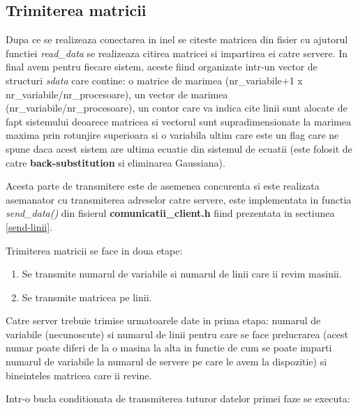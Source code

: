 \subsection{Trimiterea matricii}

\hspace{5mm}Dupa ce se realizeaza conectarea in inel se citeste matricea din
fisier cu ajutorul functiei {\it read\_data} se realizeaza citirea matricei si 
impartirea ei catre servere. In final avem pentru fiecare sistem, aceste
fiind organizate intr-un vector de structuri {\it sdata} care contine: o 
matrice de marimea (nr\_variabile+1 x nr\_variabile/nr\_procesoare), un
vector de marimea (nr\_variabile/nr\_procesoare), un contor care va indica
cite linii sunt alocate de fapt sistemului deoarece matricea si vectorul sunt
supradimensionate la marimea maxima prin rotunjire superioara si o variabila
ultim care este un flag care ne spune daca acest sistem are ultima ecuatie
din sistemul de ecuatii (este folosit de catre {\bf back-substitution} si
eliminarea Gaussiana).

Acesta parte de transmitere este de asemenea concurenta si este realizata
asemanator cu transmiterea adreselor catre servere, este implementata in
functia {\it send\_data()} din fisierul {\bf comunicatii\_client.h} fiind
prezentata in sectiunea \ref{send-linii}.

Trimiterea matricii se face in doua etape:
\begin{enumerate}
\item Se transmite numarul de variabile si numarul de linii care ii revim
masinii.
\item Se transmite matricea pe linii.
\end{enumerate}

Catre server trebuie trimise urmatoarele date in prima etapa: numarul de variabile
(necunoscute) si numarul de linii pentru care se face prelucrarea (acest
numar poate diferi de la o masina la alta in functie de cum se poate imparti
numarul de variabile la numarul de servere pe care le avem la dispozitie) si
bineinteles matricea care ii revine.

Intr-o bucla conditionata de transmiterea tuturor datelor primei faze se
executa:

